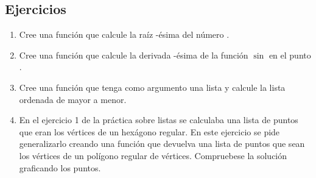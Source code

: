 \subsection*{Ejercicios}

\begin{enumerate}
		
	\item %
		Cree una función  que calcule la raíz
		-ésima del número .

	\item %
		Cree una función  que calcule la derivada
		-ésima de la función $\sin$ en el punto .


	\item %
		Cree una función que tenga como argumento una lista y
		calcule la lista ordenada de mayor a menor.

	\item %
		En el ejercicio 1 de la práctica sobre listas se calculaba
		una lista de puntos que eran los vértices de un hexágono regular.
		En este ejercicio se pide generalizarlo creando una función
		 que devuelva una lista de puntos
		que sean los vértices de un polígono regular de  vértices.
		Compruebese la solución graficando los puntos.


\end{enumerate}
